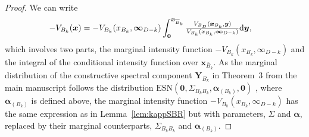 \documentclass[lineno]{biometrika}
\begin{document}
\begin{proof}
We can write 
\begin{align*}
-V_{B_k}(\bm x) 
&=-V_{B_k}(x_{B_k},\bm\infty_{D-k})\int_{\bm 0}^{\bm x_{{\overline{B}}_k}}{\textstyle{V_{B_D}(\bm x_{B_k},\bm y)\over V_{B_k}(x_{B_k},\bm\infty_{D-k})}} \text d \bm y,
\end{align*}
which involves two parts, the marginal intensity function $-V_{B_k}(x_{B_k},\infty_{D-k})$ and the integral of the conditional intensity function over $\bm x_{\bar B_k}$. As the marginal distribution of the constructive spectral component $\bm Y_{B_k}$ in Theorem~3 from the main manuscript follows the distribution $\text{ESN}(\bm 0,\Sigma_{B_kB_k},\bm\alpha_{(B_k)},\bm 0)$ \citep[Chapter 5.1.4]{Azzalini:2013}, where $\bm\alpha_{(B_k)}$ is defined above, the marginal intensity function $-V_{B_k}(x_{B_k},\infty_{D-k})$ has the same expression as in Lemma~\ref{lem:kappSBR} but with parameters, $\Sigma$ and $\bm\alpha$, replaced by their marginal counterparts, $\Sigma_{B_kB_k}$ and $\bm\alpha_{(B_k)}$. 


\end{proof}
\end{document}
